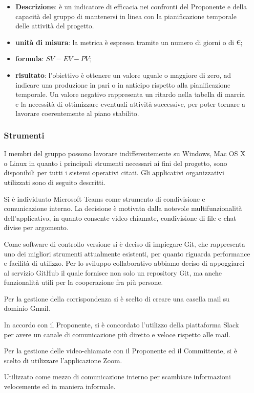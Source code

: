 		\begin{itemize}
			\item \textbf{Descrizione}: è un indicatore di efficacia nei confronti del Proponente e della capacità del gruppo di mantenersi in linea con la pianificazione temporale delle attività del progetto.
			\item \textbf{unità di misura}: la metrica è espressa tramite un numero di giorni o di \euro;
			\item \textbf{formula}: $SV = EV - PV$;
			\item \textbf{risultato}: l'obiettivo è ottenere un valore uguale o maggiore di zero, ad indicare una produzione in pari o in anticipo rispetto alla pianificazione temporale. Un valore negativo rappresenta un ritardo nella tabella di marcia e la necessità di ottimizzare eventuali attività successive, per poter tornare a lavorare coerentemente al piano stabilito.
		\end{itemize}
		\subsubsection{Strumenti}
			I membri del gruppo \Gruppo{} possono lavorare indifferentemente su Windows, Mac OS X o Linux in quanto i principali strumenti necessari ai fini del progetto, sono disponibili per tutti i sistemi operativi citati. Gli applicativi organizzativi utilizzati sono di seguito descritti.
			
				Si è individuato Microsoft Teams come strumento di condivisione e comunicazione interno. La decisione è motivata dalla notevole multifunzionalità dell'applicativo, in quanto consente video-chiamate, condivisione di file e chat divise per argomento.
				
				Come software di controllo versione si è deciso di impiegare Git, che rappresenta uno dei migliori strumenti attualmente esistenti, per quanto riguarda performance e facilità di utilizzo. Per lo sviluppo collaborativo abbiamo deciso di appoggiarci al servizio GitHub il quale fornisce non solo un repository\ped{\textit{G}} Git, ma anche funzionalità utili per la cooperazione fra più persone.
							
				Per la gestione della corrispondenza si è scelto di creare una casella mail su dominio Gmail.
				
				In accordo con il Proponente, si è concordato l'utilizzo della piattaforma Slack per avere un canale di comunicazione più diretto e veloce rispetto alle mail.
			
				Per la gestione delle video-chiamate con il Proponente ed il Committente, si è scelto di utilizzare l'applicazione Zoom.
				
				Utilizzato come mezzo di comunicazione interno per scambiare informazioni velocemente ed in maniera informale.
	